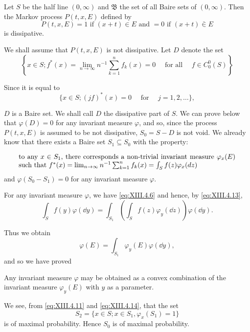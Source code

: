 \begin{examplen} Let $S$ be the half line $(0, \infty)$ and $\mathfrak{B}$ the set of all Baire sets of $(0, \infty)$. Then the Markov process $P(t, x, E)$ defined by
\[
P (t, x, E) = 1 \text{ if } (x + t) \in E \text{ and } = 0 \text{ if } (x + t) \bar {\in} E
\]
is dissipative. 

We shall assume that $P(t, x, E)$ is not dissipative. Let $D$ denote the set 
\[
\left\{x \in S; f ^{*} (x) = \lim\limits _{n \rightarrow \infty} n ^{-1} \sum\limits_{k=1} ^{n} f _{k} (x) = 0 \quad \text{ for all } \quad f \in C _{0} ^{0} (S) \right\}
\]

Since it is equal to 
\[
\{x \in S; (j f) ^{*} (x) = 0 \quad \text{ for } \quad j = 1, 2, \dots \},
\]

$D$ is a Baire set. We shall call $D$ the dissipative part of $S$. We can prove below that $\varphi(D)=0$ for any invariant measure $\varphi$, and so, since the process $P(t,x,E)$ is assumed to be not dissipative, $S_{0}=S-D$ is not void. We already know that there exists a Baire set $S_{1}\subseteq S_{0}$ with the property: 

\begin{equation}\label{eq:XIII.4.13}
\parbox{0.92\linewidth}{\everymath{}\let\limits\nolimits to any $x \in S_1$, there corresponds a non-trivial invariant measure $\varphi_{x} (E)$ such that $f ^{*} (x) = \lim\limits_{n \to \infty} n ^{-1} \sum\limits_{k=1} ^{n} f _{k} (x) = \int_{S} f (z) \varphi_{x} (d z)$}
\end{equation}
and $\varphi(S_0 - S_1) = 0$ for any invariant measure $\varphi$. 


For any invariant measure $\varphi$, we have \eqref{eq:XIII.4.6} and hence, by \eqref{eq:XIII.4.13}, 
\[
\int_{S} f (y) \varphi (\dd y) = \int_ {S _{1}} \left(\int_{S} f (z) \varphi_{y} (\dd z)\right) \varphi (\dd y).
\]

Thus we obtain 
\begin{equation}\label{eq:XIII.4.14}
\varphi (E) = \int_ {S _{1}} \varphi_{y} (E) \varphi (\dd y),
\end{equation}
and so we have proved 

\end{examplen}
\begin{theorem}\label{thm:XIII.4.Theorem.2} Any invariant measure $\varphi$ may be obtained as a convex combination of the invariant measure $\varphi_y(E)$ with $y$ as a parameter. 
\end{theorem}

We see, from \eqref{eq:XIII.4.11} and \eqref{eq:XIII.4.14}, that the set 
\[
S _{2} = \{x \in S; x \in S _{1}, \varphi_{x} (S _{1}) = 1 \}
\]
is of maximal probability. Hence $S_0$ is of maximal probability. 

